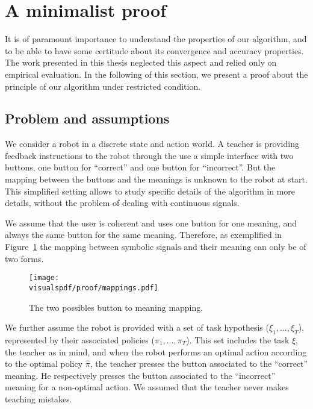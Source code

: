 
\section{A minimalist proof}
\label{chapter:limitations:proof}

It is of paramount importance to understand the properties of our algorithm, and to be able to have some certitude about its convergence and accuracy properties. The work presented in this thesis neglected this aspect and relied only on empirical evaluation. In the following of this section, we present a proof about the principle of our algorithm under restricted condition.


\subsection{Problem and assumptions}

We consider a robot in a discrete state and action world. A teacher is providing feedback instructions to the robot through the use a simple interface with two buttons, one button for ``correct'' and one button for ``incorrect''. But the mapping between the buttons and the meanings is unknown to the robot at start. This simplified setting allows to study specific details of the algorithm in more details, without the problem of dealing with continuous signals.

We assume that the user is coherent and uses one button for one meaning, and always the same button for the same meaning. Therefore, as exemplified in Figure~\ref{fig:proofmapping} the mapping between symbolic signals and their meaning can only be of two forms. 

\begin{figure}[!htbp]
\centering
\texttt{[image: \\visualspdf/proof/mappings.pdf]}
\caption{The two possibles button to meaning mapping.}
\label{fig:proofmapping}
\end{figure} 

We further assume the robot is provided with a set of task hypothesis ($\xi_1,\ldots,\xi_T$), represented by their associated policies ($\pi_1, \ldots, \pi_T$). This set includes the task $\hat{\xi}$, the teacher as in mind, and when the robot performs an optimal action according to the optimal policy $\hat{\pi}$, the teacher presses the button associated to the ``correct'' meaning. He respectively presses the button associated to the ``incorrect'' meaning for a non-optimal action. We assumed that the teacher never makes teaching mistakes.

